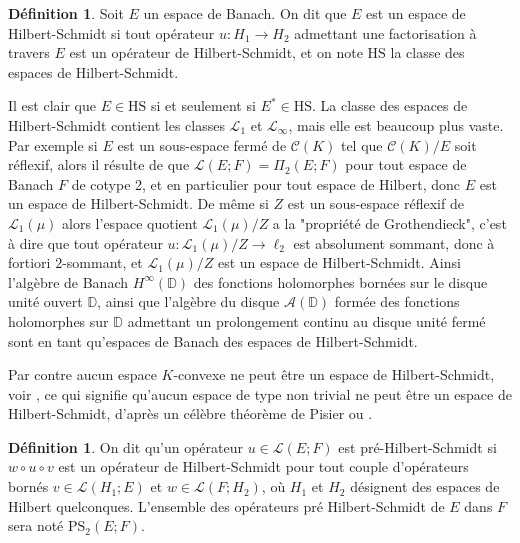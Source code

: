 \documentclass{smfart}
\theoremstyle{plain}
\theoremstyle{definition}
\newtheorem{definition}[theorem]{Définition}
\newcommand\DD{{\mathbb D}}
\newcommand {\ELL} {{\mathcal L}}
\newcommand {\BOUNDED} {{\mathcal L}}
\newcommand {\PHS} {\mathrm{PS}_2}
\newcommand {\ESPACEHS} {\mathrm{HS}}
\begin{document}
\begin{definition} Soit $E$ un espace de Banach. On dit que $E$ est un
  espace de Hilbert-Schmidt si tout opérateur $u:H_1\to H_2$
  admettant une factorisation à travers $E$ est un opérateur de
  Hilbert-Schmidt, et on note $\ESPACEHS$ la classe des espaces de
  Hilbert-Schmidt.
\end{definition}

\noindent Il est clair que $E \in \ESPACEHS$ si et seulement si $E^*\in
\ESPACEHS$. La classe des espaces de Hilbert-Schmidt contient les classes
$\ELL_1$ et $\ELL_{\infty}$, mais elle est beaucoup plus vaste. Par
exemple si $E$ est un sous-espace fermé de ${\mathcal C}(K)$ tel que
${\mathcal C}(K)/E$ soit réflexif, alors il résulte de
\cite[Théorème~15.13]{DJT} que ${\mathcal L}(E; F)=\Pi_2(E; F)$ pour
tout espace de Banach $F$ de cotype 2, et en particulier pour tout
espace de Hilbert, donc $E$ est un espace de Hilbert-Schmidt. De même
si $Z$ est un sous-espace réflexif de $\ELL_1(\mu)$ alors l'espace
quotient $\ELL_1(\mu)/Z$ a la "propriété de Grothendieck", c'est à dire
que tout opérateur $u: \ELL_1(\mu)/Z\to \ell_2$ est absolument sommant,
donc à fortiori $2$-sommant, et $\ELL_1(\mu)/Z$ est un espace de
Hilbert-Schmidt. Ainsi l'algèbre de Banach $H^{\infty}(\DD)$ des
fonctions holomorphes bornées sur le disque unité ouvert $\DD$, ainsi
que l'algèbre du disque ${\mathcal A}(\DD)$ formée des fonctions
holomorphes sur $\DD$ admettant un prolongement continu au disque
unité fermé sont en tant qu'espaces de Banach des espaces de
Hilbert-Schmidt.

\noindent  %
Par contre aucun espace $K$-convexe ne peut être un espace
de Hilbert-Schmidt, voir \cite[page 443]{DJT}, ce qui signifie qu'aucun
espace de type non trivial ne peut être un espace de
Hilbert-Schmidt, d'après un célèbre théorème de Pisier
\cite{Pis2} ou \cite[Théorème~13.3]{DJT}.




\begin{definition}\label{def:PS2} On dit qu'un opérateur $u \in \BOUNDED(E;F)$ est pré-Hilbert-Schmidt si $w\circ u \circ v$ est un opérateur de
  Hilbert-Schmidt pour tout couple d'opérateurs bornés $v \in
  \BOUNDED(H_1; E)$ et $w \in \BOUNDED(F;H_2)$, où $H_1$ et $H_2$
  désignent des espaces de Hilbert quelconques.  L'ensemble des
  opérateurs pré Hilbert-Schmidt de $E$ dans $F$ sera noté $\PHS(E;
  F)$.
\end{definition}
\end{document}
